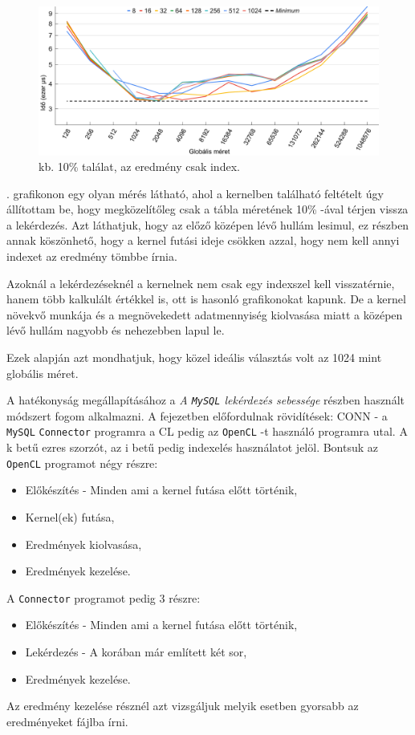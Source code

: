\begin{figure}[h!]
\centering
\includegraphics[width=\textwidth]{images/graph/global_size_2.png}
\caption{kb. 10\% találat, az eredmény csak index.}
\label{fig:global_size_2}
\end{figure}

. grafikonon egy olyan mérés látható, ahol a kernelben található feltételt úgy állítottam be, hogy megközelítőleg csak a tábla méretének 10\% -ával térjen vissza a lekérdezés.
Azt láthatjuk, hogy az előző középen lévő hullám lesimul, ez részben annak köszönhető, hogy a kernel futási ideje csökken azzal, hogy nem kell annyi indexet az eredmény tömbbe írnia.

Azoknál a lekérdezéseknél a kernelnek nem csak egy indexszel kell visszatérnie, hanem több kalkulált értékkel is, ott is hasonló grafikonokat kapunk. De a kernel növekvő munkája és a megnövekedett adatmennyiség kiolvasása miatt a középen lévő hullám nagyobb és nehezebben lapul le.

Ezek alapján azt mondhatjuk, hogy közel ideális választás volt az 1024 mint globális méret.


A hatékonyság megállapításához a \textit{A \texttt{MySQL} lekérdezés sebessége} részben használt módszert fogom alkalmazni.
A fejezetben előfordulnak rövidítések: CONN - a \texttt{MySQL} \texttt{Connector} programra a CL pedig az \texttt{OpenCL} -t használó programra utal. 
A k betű ezres szorzót, az i betű pedig indexelés használatot jelöl.
\newline Bontsuk az \texttt{OpenCL} programot négy részre:
\begin{itemize}
\item Előkészítés - Minden ami a kernel futása előtt történik,
\item Kernel(ek) futása,
\item Eredmények kiolvasása,
\item Eredmények kezelése.
\end{itemize}
A \texttt{Connector} programot pedig 3 részre:
\begin{itemize}
\item Előkészítés - Minden ami a kernel futása előtt történik,
\item Lekérdezés - A korában már említett két sor,
\item Eredmények kezelése.
\end{itemize}
Az eredmény kezelése résznél azt vizsgáljuk melyik esetben gyorsabb az eredményeket fájlba írni.


